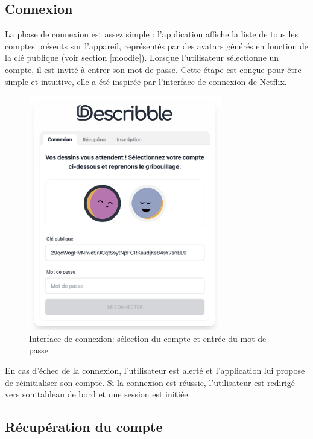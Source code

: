 \subsection{Connexion}

La phase de connexion est assez simple : l'application affiche la liste de tous les comptes présents sur l'appareil, représentés par des avatars générés en fonction de la clé publique (voir section \ref{moodie}). Lorsque l'utilisateur sélectionne un compte, il est invité à entrer son mot de passe. Cette étape est conçue pour être simple et intuitive, elle a été inspirée par l'interface de connexion de Netflix.

\begin{figure}[H]
    \centering
    \includegraphics[width=0.75\textwidth]{assets/figures/describble-login.png}
    \caption{Interface de connexion: sélection du compte et entrée du mot de passe}
\end{figure}

En cas d'échec de la connexion, l'utilisateur est alerté et l'application lui propose de réinitialiser son compte. Si la connexion est réussie, l'utilisateur est redirigé vers son tableau de bord et une session est initiée.

\subsection{Récupération du compte}

